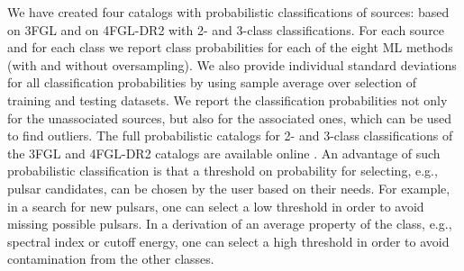 We have created four catalogs with probabilistic classifications of sources: based on 3FGL and on 4FGL-DR2 with 2- and 3-class classifications.
For each source and for each class we report class probabilities for each of the eight ML methods (with and without oversampling). 
We also provide individual standard deviations for all classification probabilities by using sample average over selection of training and testing datasets.
We report the classification probabilities not only for the unassociated sources, but also for the associated ones, which can be used to find outliers.
The full probabilistic catalogs for 2- and 3-class classifications of the 3FGL and 4FGL-DR2 catalogs are available online \citep{SOM_material}.
An advantage of such probabilistic classification is that a threshold on probability for selecting, e.g., pulsar candidates, can be chosen by the user based on their needs.
For example, in a search for new pulsars, one can select a low threshold in order to avoid missing possible pulsars.
In a derivation of an average property of the class, e.g., spectral index or cutoff energy, one can select a high threshold in order to avoid contamination from the other classes.

